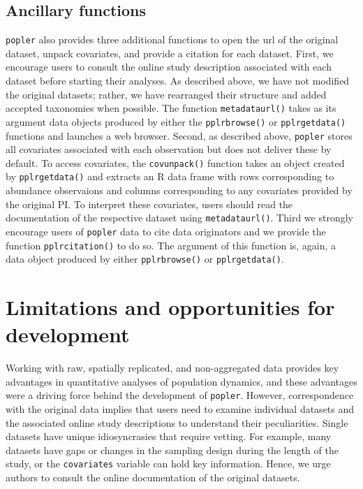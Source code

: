 \documentclass{article}\usepackage[]{graphicx}\usepackage[]{color}
\begin{document}
\subsection*{Ancillary functions}
\texttt{popler} also provides three additional functions to open the url of the original dataset, unpack covariates, and provide a citation for each dataset. First, we encourage users to consult the online study description associated with each dataset before starting their analyses. As described above, we have not modified the original datasets; rather, we have rearranged their structure and added accepted taxonomies when possible. The function \texttt{metadata\textunderscore url()} takes as its argument data objects produced by either the \texttt{pplr\textunderscore browse()} or \texttt{pplr\textunderscore get\textunderscore data()} functions and launches a web browser. Second, as described above, \texttt{popler} stores all covariates associated with each observation but does not deliver these by default. To access covariates, the \texttt{cov\textunderscore unpack()} function takes an object created by \texttt{pplr\textunderscore get\textunderscore data()} and extracts an R data frame with rows corresponding to abundance observaions and columns corresponding to any covariates provided by the original PI. To interpret these covariates, users should read the documentation of the respective dataset using \texttt{metadata\textunderscore url()}. Third we strongly encourage users of \texttt{popler} data to cite data originators and we provide the function \texttt{pplr\textunderscore citation()} to do so. The argument of this function is, again, a data object produced by either \texttt{pplr\textunderscore browse()} or \texttt{pplr\textunderscore get\textunderscore data()}.

\section*{Limitations and opportunities for development}
Working with raw, spatially replicated, and non-aggregated data provides key advantages in quantitative analyses of population dynamics, and these advantages were a driving force behind the development of \texttt{popler}. However, correspondence with the original data implies that users need to examine individual datasets and the associated online study descriptions to understand their peculiarities. Single datasets have unique idiosyncrasies that require vetting. For example, many datasets have gaps or changes in the sampling design during the length of the study, or the  \texttt{covariates} variable can hold key information. Hence, we urge authors to consult the online documentation of the original datasets.
\end{document}
